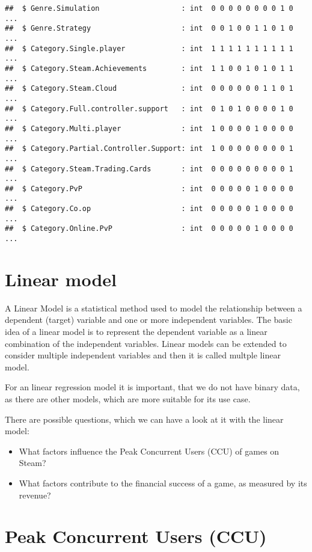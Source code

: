 \documentclass[
]{article}
\providecommand{\tightlist}{%
  \setlength{\itemsep}{0pt}\setlength{\parskip}{0pt}}
\begin{document}
\begin{verbatim}
##  $ Genre.Simulation                   : int  0 0 0 0 0 0 0 0 1 0 ...
##  $ Genre.Strategy                     : int  0 0 1 0 0 1 1 0 1 0 ...
##  $ Category.Single.player             : int  1 1 1 1 1 1 1 1 1 1 ...
##  $ Category.Steam.Achievements        : int  1 1 0 0 1 0 1 0 1 1 ...
##  $ Category.Steam.Cloud               : int  0 0 0 0 0 0 1 1 0 1 ...
##  $ Category.Full.controller.support   : int  0 1 0 1 0 0 0 0 1 0 ...
##  $ Category.Multi.player              : int  1 0 0 0 0 1 0 0 0 0 ...
##  $ Category.Partial.Controller.Support: int  1 0 0 0 0 0 0 0 0 1 ...
##  $ Category.Steam.Trading.Cards       : int  0 0 0 0 0 0 0 0 0 1 ...
##  $ Category.PvP                       : int  0 0 0 0 0 1 0 0 0 0 ...
##  $ Category.Co.op                     : int  0 0 0 0 0 1 0 0 0 0 ...
##  $ Category.Online.PvP                : int  0 0 0 0 0 1 0 0 0 0 ...
\end{verbatim}

\hypertarget{linear-model}{%
\section{Linear model}\label{linear-model}}

A Linear Model is a statistical method used to model the relationship
between a dependent (target) variable and one or more independent
variables. The basic idea of a linear model is to represent the
dependent variable as a linear combination of the independent variables.
Linear models can be extended to consider multiple independent variables
and then it is called multple linear model.

For an linear regression model it is important, that we do not have
binary data, as there are other models, which are more suitable for its
use case.

There are possible questions, which we can have a look at it with the
linear model:

\begin{itemize}
\tightlist
\item
  What factors influence the Peak Concurrent Users (CCU) of games on
  Steam?
\item
  What factors contribute to the financial success of a game, as
  measured by its revenue?
\end{itemize}

\hypertarget{peak-concurrent-users-ccu}{%
\section{Peak Concurrent Users (CCU)}\label{peak-concurrent-users-ccu}}
\end{document}
